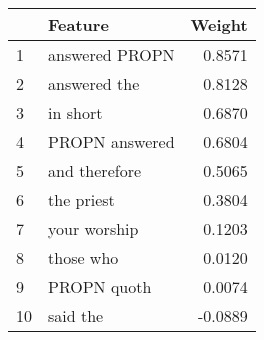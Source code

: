 \begin{tabular}{llr}
\toprule
{} &         Feature &  Weight \\
\midrule
1  &  answered PROPN &  0.8571 \\
2  &    answered the &  0.8128 \\
3  &        in short &  0.6870 \\
4  &  PROPN answered &  0.6804 \\
5  &   and therefore &  0.5065 \\
6  &      the priest &  0.3804 \\
7  &    your worship &  0.1203 \\
8  &       those who &  0.0120 \\
9  &     PROPN quoth &  0.0074 \\
10 &        said the & -0.0889 \\
\bottomrule
\end{tabular}
